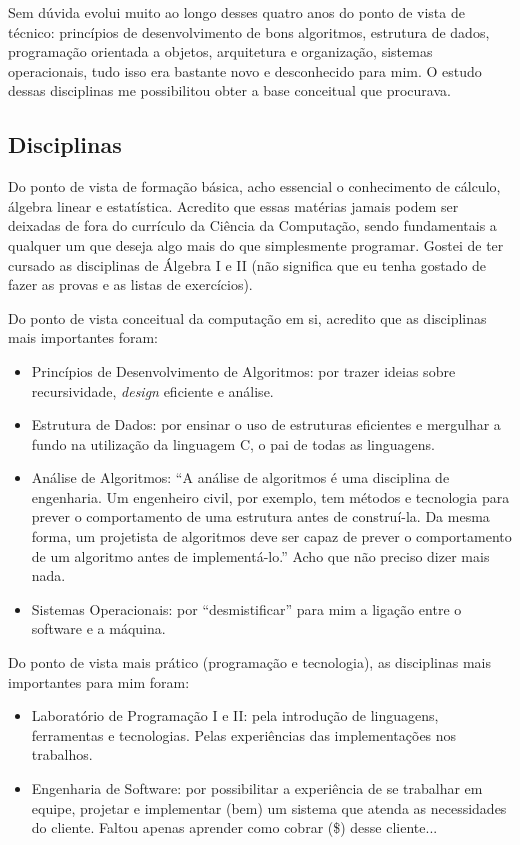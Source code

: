 Sem dúvida evolui muito ao longo desses quatro anos do ponto de vista de técnico: princípios de
desenvolvimento de bons algoritmos, estrutura de dados, programação orientada a objetos, arquitetura
e organização, sistemas operacionais, tudo isso era bastante novo e desconhecido para mim. O estudo
dessas disciplinas me possibilitou obter a base conceitual que procurava.

\subsection{Disciplinas}

Do ponto de vista de formação básica, acho essencial o conhecimento de cálculo, álgebra linear e
estatística. Acredito que essas matérias jamais podem ser deixadas de fora do currículo da Ciência
da Computação, sendo fundamentais a qualquer um que deseja algo mais do que simplesmente programar.
Gostei de ter cursado as disciplinas de Álgebra I e II (não significa que eu tenha gostado de fazer
as provas e as listas de exercícios).

Do ponto de vista conceitual da computação em si, acredito que as disciplinas mais importantes
foram:

\begin{itemize}
	\item Princípios de Desenvolvimento de Algoritmos: por trazer ideias sobre recursividade, 
	{\it design} eficiente e análise.
	\item Estrutura de Dados: por ensinar o uso de estruturas eficientes e mergulhar a fundo na
	utilização da linguagem C, o pai de todas as linguagens.
	\item Análise de Algoritmos: ``A análise de algoritmos é uma disciplina de engenharia. Um
	engenheiro civil, por exemplo, tem métodos e tecnologia para prever o comportamento de uma 
	estrutura antes de construí-la. Da mesma forma, um projetista de algoritmos deve ser capaz de 
	prever o comportamento de um algoritmo antes de implementá-lo.'' Acho que não preciso dizer mais
	nada.
	\item Sistemas Operacionais: por ``desmistificar'' para mim a ligação entre o software e a 
	máquina.
\end{itemize}

Do ponto de vista mais prático (programação e tecnologia), as disciplinas mais importantes para mim
foram:

\begin{itemize}
	\item Laboratório de Programação I e II: pela introdução de linguagens, ferramentas e tecnologias.
	Pelas experiências das implementações nos trabalhos.
	\item Engenharia de Software: por possibilitar a experiência de se trabalhar em equipe,
	projetar e implementar (bem) um sistema que atenda as necessidades do cliente. Faltou apenas 
	aprender como cobrar (\$) desse cliente...
\end{itemize}

